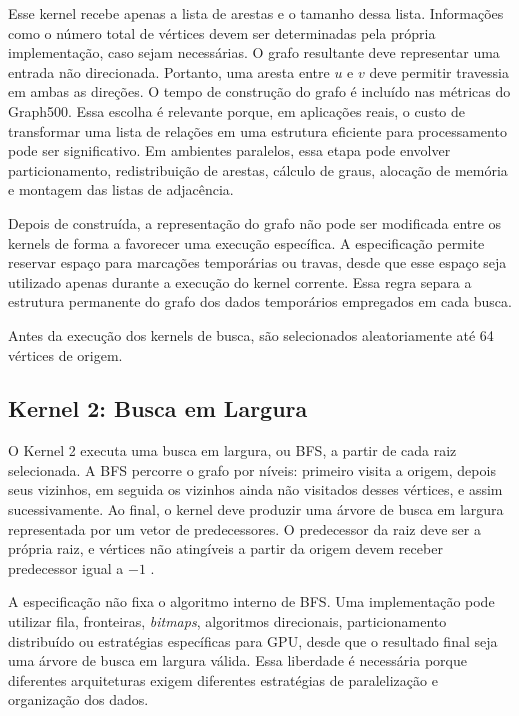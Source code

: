 Esse kernel recebe apenas a lista de arestas e o tamanho dessa lista. Informações como o número total de vértices devem ser determinadas pela própria implementação, caso sejam necessárias. O grafo resultante deve representar uma entrada não direcionada. Portanto, uma aresta entre $u$ e $v$ deve permitir travessia em ambas as direções.
O tempo de construção do grafo é incluído nas métricas do Graph500. 
Essa escolha é relevante porque, em aplicações reais, o custo de transformar uma lista de relações em uma estrutura eficiente para processamento pode ser significativo. Em ambientes paralelos, essa etapa pode envolver particionamento, redistribuição de arestas, cálculo de graus, alocação de memória e montagem das listas de adjacência.

Depois de construída, a representação do grafo não pode ser modificada entre os kernels de forma a favorecer uma execução específica. A especificação permite reservar espaço para marcações temporárias ou travas, desde que esse espaço seja utilizado apenas durante a execução do kernel corrente. Essa regra separa a estrutura permanente do grafo dos dados temporários empregados em cada busca.

Antes da execução dos kernels de busca, são selecionados aleatoriamente até 64 vértices de origem. 

\subsection{Kernel 2: Busca em Largura}
\label{sec:graph500-kernel2}

O Kernel 2 executa uma busca em largura, ou BFS, a partir de cada raiz selecionada. 
A BFS percorre o grafo por níveis: primeiro visita a origem, depois seus vizinhos, em seguida os vizinhos ainda não visitados desses vértices, e assim sucessivamente. 
Ao final, o kernel deve produzir uma árvore de busca em largura representada por um vetor de predecessores. 
O predecessor da raiz deve ser a própria raiz, e vértices não atingíveis a partir da origem devem receber predecessor igual a $-1$ \cite{graph500spec, cormenalgorithms}.

A especificação não fixa o algoritmo interno de BFS. Uma implementação pode utilizar fila, fronteiras, \textit{bitmaps}, algoritmos direcionais, particionamento distribuído ou estratégias específicas para GPU, desde que o resultado final seja uma árvore de busca em largura válida. Essa liberdade é necessária porque diferentes arquiteturas exigem diferentes estratégias de paralelização e organização dos dados.

